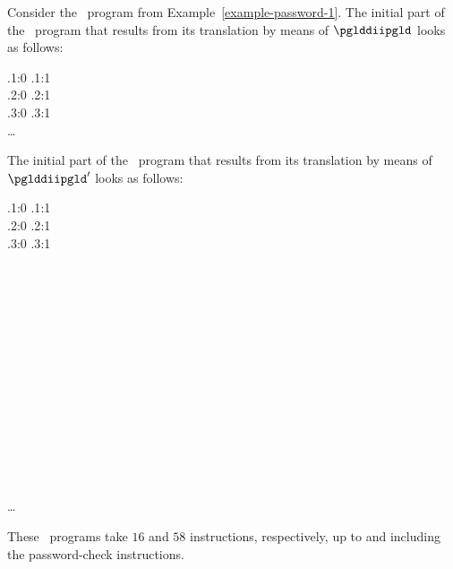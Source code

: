 \documentclass[fleqn]{llncs}
\begin{document}
\begin{example}
Consider the \PGLDdii\ program from Example~\ref{example-password-1}.
The initial part of the \PGLD\ program that results from its translation
by means of $\pglddiipgld$ looks as follows:
\begin{ldispl}
 \conc {} \conc
\rfdt.\setr{:}1{:}0 \conc {} \conc \rfdt.\setr{:}1{:}1 \conc {} \\
 \conc {} \conc
\rfdt.\setr{:}2{:}0 \conc {} \conc \rfdt.\setr{:}2{:}1 \conc {} \\
 \conc {} \conc
\rfdt.\setr{:}3{:}0 \conc {} \conc \rfdt.\setr{:}3{:}1 \conc {} \\
 \conc \ldots
\end{ldispl}The initial part of the \PGLD\ program that results from its translation
by means of $\pglddiipgld'$ looks as follows:
\begin{ldispl}
 \conc {} \conc
\rf.\setr{:}1{:}0 \conc {} \conc \rf.\setr{:}1{:}1 \conc {} \\
 \conc {} \conc
\rf.\setr{:}2{:}0 \conc {} \conc \rf.\setr{:}2{:}1 \conc {} \\
 \conc {} \conc
\rf.\setr{:}3{:}0 \conc {} \conc \rf.\setr{:}3{:}1 \conc {} \\
 \conc
{} \conc {} \conc {} \\
 \conc
{} \conc {} \conc {} \\
 \conc
{} \conc {} \conc {} \\
 \conc
{} \conc {} \conc {} \\
 \conc
{} \conc {} \conc {} \\
 \conc
{} \conc {} \conc {} \\
 \conc
{} \conc {} \conc {} \\
 \conc
{} \conc {} \conc {} \\
 \conc
{} \conc {} \conc {} \\
 \conc
{} \conc {} \conc {} \\
 \conc
{} \conc {} \conc {} \\
 \conc
{} \conc {} \conc {} \\
 \conc
{} \conc {} \conc {} \\
 \conc
{} \conc {} \conc {} \\
 \conc {} \ldots
\end{ldispl}These \PGLD\ programs take $16$ and $58$ instructions, respectively, up
to and including the password-check instructions.


\end{example}
\end{document}
